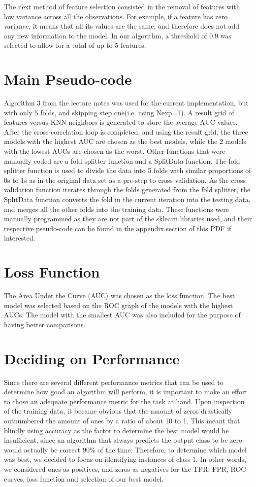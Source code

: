 \documentclass{article}
\begin{document}
The next method of feature selection consisted in the removal of features with low variance across all the observations. For example, if a feature has zero variance, it means that all its values are the same, and therefore does not add any new information to the model. In our algorithm, a threshold of 0.9 was selected to allow for a total of up to 5 features. 

 \section{Main Pseudo-code}
Algorithm 3 from the lecture notes was used for the current implementation, but with only 5 folds, and skipping step one(i.e. using Nexp=1). A result grid of features versus KNN neighbors is generated to store the average AUC values. After the cross-correlation loop is completed, and using the result grid, the three models with the highest AUC are chosen as the best models, while the 2 models with the lowest AUCs are chosen as the worst. Other functions that were manually coded are a fold splitter function and a SplitData function. The fold splitter function is used to divide the data into 5 folds with similar proportions of 0s to 1s as in the original data set as a pre-step to cross validation. As the cross validation function iterates through the folds generated from the fold splitter, the SplitData function converts the fold in the current iteration into the testing data, and merges all the other folds into the training data. These functions were manually programmed as they are not part of the sklearn libraries used, and their respective pseudo-code can be found in the appendix section of this PDF if interested. \\


\section{Loss Function }  
The Area Under the Curve (AUC) was chosen as the loss function. The best model was selected based on the ROC graph of the models with the highest AUCs. The model with the smallest AUC was also included for the purpose of having better comparisons. 

\section{Deciding on Performance}  
Since there are several different performance metrics that can be used to determine how good an algorithm will perform, it is important to make an effort to chose an adequate performance metric for the task at hand. Upon inspection of the training data, it became obvious that the amount of zeros drastically outnumbered the amount of ones by a ratio of about 10 to 1. This meant that blindly using accuracy as the factor to determine the best model would be insufficient, since an algorithm that always predicts the output class to be zero would actually be correct 90\% of the time. Therefore, to determine which model was best, we decided to focus on identifying instances of class 1. In other words, we considered ones as positives, and zeros as negatives for the TPR, FPR, ROC curves, loss function and selection of our best model.
\end{document}
